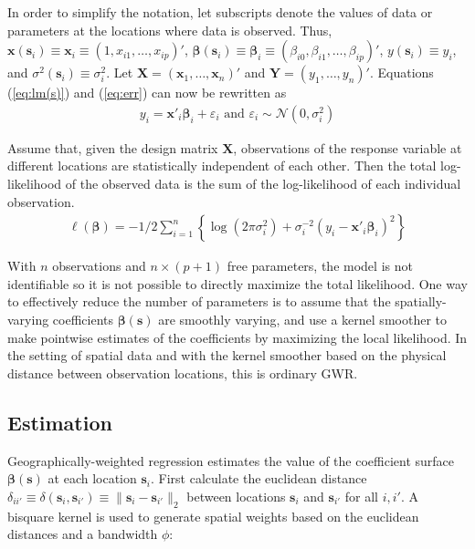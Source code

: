 \documentclass[authoryear, review, 11pt]{elsarticle}
\begin{document}
	In order to simplify the notation, let subscripts denote the values of data or parameters at the locations where data is observed. Thus, $\bm{x}(\bm{s}_i) \equiv \bm{x}_i \equiv \left( 1, x_{i1}, \dots, x_{ip} \right)'$, $\bm{\beta}(\bm{s}_i) \equiv \bm{\beta}_i \equiv \left(\beta_{i0}, \beta_{i1}, \dots, \beta_{ip} \right)'$, $y(\bm{s}_i) \equiv y_i$, and $\sigma^2(\bm{s}_i) \equiv \sigma^2_i$. Let $\bm{X} = \left( \bm{x}_1, \dots, \bm{x}_n \right)'$ and $\bm{Y} = \left( y_1, \dots, y_n \right)'$. Equations (\ref{eq:lm(s)}) and (\ref{eq:err}) can now be rewritten as
	\begin{eqnarray}
		y_i = \bm{x}'_i \bm{\beta}_i + \varepsilon_i \text{ and } \varepsilon_i \sim \mathcal{N} \left( 0,\sigma_i^2 \right)
	\end{eqnarray}
	
	Assume that, given the design matrix $\bm{X}$, observations of the response variable at different locations are statistically independent of each other. Then the total log-likelihood of the observed data is the sum of the log-likelihood of each individual observation.
	 \begin{eqnarray}
	 	\ell\left( \bm{\beta} \right) = - 1/2 \sum_{i=1}^n \left\{  \log \left( 2 \pi \sigma^2_i\right) +  \sigma^{-2}_i  \left(y_i - \bm{x}'_i\bm{\beta}_i \right)^2  \right\}
	\end{eqnarray}
	
	With $n$ observations and $n \times (p+1)$ free parameters, the model is not identifiable so it is not possible to directly maximize the total likelihood. One way to effectively reduce the number of parameters is to assume that the spatially-varying coefficients $\bm{\beta}(\bm{s})$ are smoothly varying, and use a kernel smoother to make pointwise estimates of the coefficients by maximizing the local likelihood. In the setting of spatial data and with the kernel smoother based on the physical distance between observation locations, this is ordinary GWR.
		
	\subsection{Estimation}		
	Geographically-weighted regression estimates the value of the coefficient surface $\bm{\beta}(\bm{s})$ at each location $\bm{s}_i$. First calculate the euclidean distance $\delta_{ii'} \equiv \delta\left(\bm{s}_i, \bm{s}_{i'}\right) \equiv \|\bm{s}_i  -\bm{s}_{i'}\|_2$ between locations $\bm{s}_i$ and $\bm{s}_{i'}$ for all $i, i'$. A bisquare kernel is used to generate spatial weights based on the euclidean distances and a bandwidth $\phi$:\\
	
\end{document}
